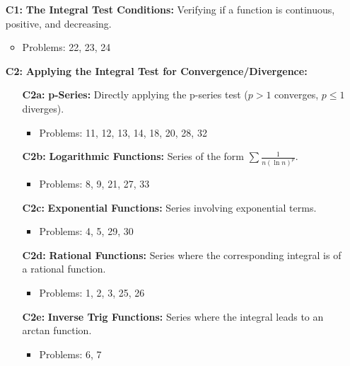 \documentclass[12pt]{article}
\begin{document}
\begin{itemize}
    \item[\textbf{C1:}] \textbf{The Integral Test Conditions:} Verifying if a function is continuous, positive, and decreasing.
        \begin{itemize}
            \item Problems: 22, 23, 24
        \end{itemize}

    \item[\textbf{C2:}] \textbf{Applying the Integral Test for Convergence/Divergence:}
        \begin{itemize}
            \item[\textbf{C2a:}] \textbf{p-Series:} Directly applying the p-series test ($p>1$ converges, $p \le 1$ diverges).
                \begin{itemize}
                    \item Problems: 11, 12, 13, 14, 18, 20, 28, 32
                \end{itemize}
            \item[\textbf{C2b:}] \textbf{Logarithmic Functions:} Series of the form $\sum \frac{1}{n(\ln n)^p}$.
                \begin{itemize}
                    \item Problems: 8, 9, 21, 27, 33
                \end{itemize}
            \item[\textbf{C2c:}] \textbf{Exponential Functions:} Series involving exponential terms.
                \begin{itemize}
                    \item Problems: 4, 5, 29, 30
                \end{itemize}
            \item[\textbf{C2d:}] \textbf{Rational Functions:} Series where the corresponding integral is of a rational function.
                \begin{itemize}
                    \item Problems: 1, 2, 3, 25, 26
                \end{itemize}
            \item[\textbf{C2e:}] \textbf{Inverse Trig Functions:} Series where the integral leads to an arctan function.
                \begin{itemize}
                    \item Problems: 6, 7
                \end{itemize}
        \end{itemize}


\end{itemize}
\end{document}

